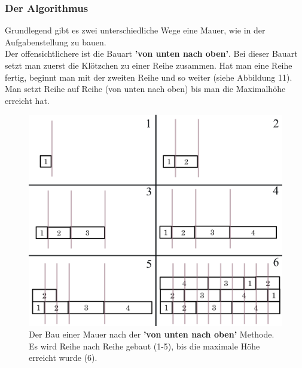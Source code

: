 \documentclass[a4paper,12pt]{article}
\begin{document}
\subsubsection{Der Algorithmus}
Grundlegend gibt es zwei unterschiedliche Wege eine Mauer, wie in der Aufgabenstellung zu bauen.
\\[0.4cm]
Der offensichtlichere ist die Bauart \textbf{'von unten nach oben'}. Bei dieser Bauart setzt man zuerst die Klötzchen zu einer Reihe zusammen. Hat man eine Reihe fertig, beginnt man mit der zweiten Reihe und so weiter (siehe Abbildung 11). Man setzt Reihe auf Reihe (von unten nach oben) bis man die Maximalhöhe erreicht hat.
\begin{figure}[H]
    \centering
    \includegraphics[width=1\linewidth]{Bilder/Aufgabe1/Definition_Mauerbauart_01.png}
    \caption{Der Bau einer Mauer nach der \textbf{'von unten nach oben'} Methode. Es wird Reihe nach Reihe gebaut (1-5), bis die maximale Höhe erreicht wurde (6).}
\end{figure}
\end{document}
